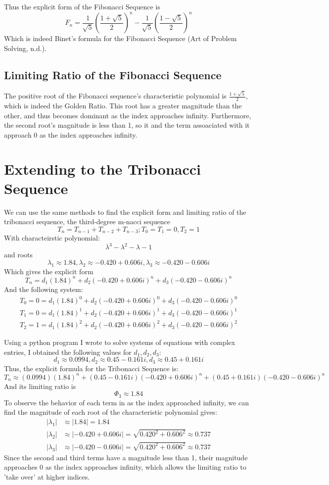 \documentclass[11pt]{article}
\begin{document}
Thus the explicit form of the Fibonacci Sequence is
    \[F_n=\frac{1}{\sqrt{5}}\left(\frac{1+\sqrt{5}}{2}\right)^n-\frac{1}{\sqrt{5}}\left(\frac{1-\sqrt{5}}{2}\right)^n\]
Which is indeed Binet's formula for the Fibonacci Sequence (Art of Problem Solving, n.d.).

\subsection{Limiting Ratio of the Fibonacci Sequence}
The positive root of the Fibonacci sequence's characteristic polynomial is $\frac{1+\sqrt{5}}{2}$, which is indeed the Golden Ratio. This root has a greater magnitude than the other, and thus becomes dominant as the index approaches infinity. Furthermore, the second root's magnitude is less than 1, so it and the term assoaciated with it approach 0 as the index approaches infinity.  



\section{Extending to the Tribonacci Sequence}
We can use the same methods to find the explicit form and limiting ratio of the tribonacci sequence, the third-degree m-nacci sequence
$$T_n=T_{n-1}+T_{n-2}+T_{n-3};T_0=T_1=0, T_2=1$$
With characteirstic polynomial:
\[\lambda^3-\lambda^2-\lambda-1\]
and roots
\[\lambda_1 \approx 1.84, \lambda_2 \approx -0.420 + 0.606i, \lambda_3 \approx -0.420 - 0.606i\]
Which gives the explicit form
\[T_n=d_1(1.84)^n+d_2(-0.420 + 0.606i)^n+d_3(-0.420 - 0.606i)^n\]
And the following system:
\begin{align*}
    T_0=0=d_1(1.84)^0+d_2(-0.420 + 0.606i)^0+d_3(-0.420 - 0.606i)^0 \\
    T_1=0=d_1(1.84)^1+d_2(-0.420 + 0.606i)^1+d_3(-0.420 - 0.606i)^1 \\
    T_2=1=d_1(1.84)^2+d_2(-0.420 + 0.606i)^2+d_3(-0.420 - 0.606i)^2
\end{align*}

Using a python program I wrote to solve systems of equations with complex entries, I obtained the following values for $d_1,d_2,d_3$:
\[d_1\approx0.0994,d_2\approx0.45-0.161i,d_3\approx0.45+0.161i\]
Thus, the explicit formula for the Tribonacci Sequence is:
\[T_n\approx(0.0994)(1.84)^n+(0.45-0.161i)(-0.420 + 0.606i)^n+(0.45+0.161i)(-0.420 - 0.606i)^n\]
And its limiting ratio is \[\Phi_3\approx1.84\]
To observe the behavior of each term in as the index approached infinity, we can find the magnitude of each root of the characteristic polynomial gives: 
\begin{align*}
    |\lambda_1|&\approx|1.84|=1.84 \\
    |\lambda_2|&\approx|-0.420 + 0.606i|=\sqrt{0.420^2+0.606^2}\approx 0.737\\
    |\lambda_3|&\approx|-0.420 - 0.606i|=\sqrt{0.420^2+0.606^2}\approx 0.737
\end{align*}
Since the second and third terms have a magnitude less than 1, their magnitude approaches 0 as the index approaches infinity, which allows the limiting ratio to 'take over' at higher indices. 
\end{document}
